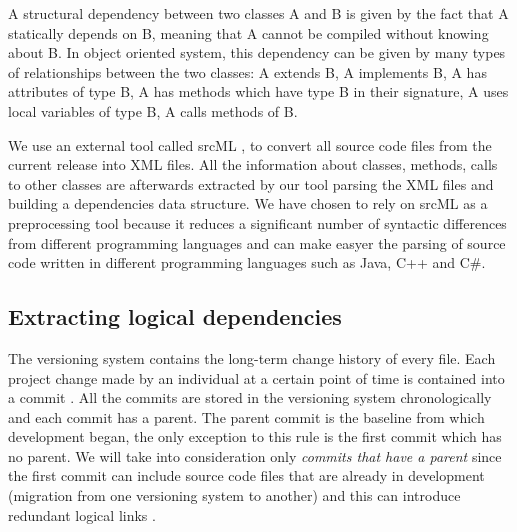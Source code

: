 \documentclass[a4paper,twoside]{article}
\begin{document}
A structural dependency between two classes A and B is given by the fact that A statically depends on B, meaning that A cannot be compiled without knowing about B. In object oriented system, this dependency can be given by many types of relationships between the two classes: A extends B, A implements B, A has attributes of type B, A has methods which have type B in their signature, A uses local variables of type B, A calls methods of B.


 We use an external tool called srcML \cite{2003:XLC:851042.857028},
\cite{Collard:2011:LTF:2067850.2068011} to convert all source code files from the current release into XML files. All the information about classes, methods, calls to other classes are afterwards extracted by our tool parsing the XML files and building a dependencies data structure. We have chosen to rely on srcML as a preprocessing tool because it reduces a significant number of syntactic differences from different programming languages and can make easyer the parsing of source code written in different programming languages such as Java, C++ and C\#.    

\subsection{Extracting logical dependencies}

The versioning system contains the long-term change history of every file. Each project change made by an individual at a certain point of time is contained into a commit \cite{svn}. All the commits are stored in the versioning system chronologically and each commit has a parent. The parent commit is the baseline from which development began, the only exception to this rule is the first commit which has no parent. We will take into consideration only \textit{commits that have a parent} since the first commit can include source code files that are already in development (migration from one versioning system to another) and this can introduce redundant logical links \cite{DBLP:journals/jss/AjienkaC17}. 
\end{document}
